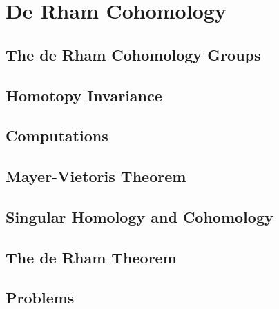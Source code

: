 \chapter{De Rham Cohomology}
\section{The de Rham Cohomology Groups}
\section{Homotopy Invariance}
\section{Computations}
\section{Mayer-Vietoris Theorem}
\section{Singular Homology and Cohomology}
\section{The de Rham Theorem}
\section{Problems}